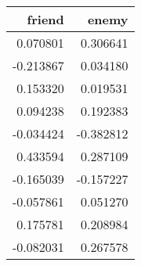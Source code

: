 \begin{tabular}{rr}
\toprule
   friend &     enemy \\
\midrule
 0.070801 &  0.306641 \\
-0.213867 &  0.034180 \\
 0.153320 &  0.019531 \\
 0.094238 &  0.192383 \\
-0.034424 & -0.382812 \\
 0.433594 &  0.287109 \\
-0.165039 & -0.157227 \\
-0.057861 &  0.051270 \\
 0.175781 &  0.208984 \\
-0.082031 &  0.267578 \\
\bottomrule
\end{tabular}

